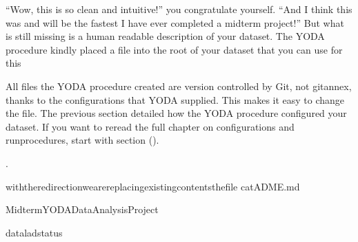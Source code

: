 \sphinxAtStartPar
“Wow, this is so clean and intuitive!” you congratulate yourself. “And I think
this was and will be the fastest I have ever completed a midterm project!”
But what is still missing is a human readable description of your dataset.
The YODA procedure kindly placed a  file into the root of your
dataset that you can use for this%
\begin{footnote}\sphinxAtStartFootnote
All  files the YODA procedure created are
version controlled by Git, not git\sphinxhyphen{}annex, thanks to the
configurations that YODA supplied. This makes it easy to change the
 file. The previous section detailed how the YODA procedure
configured your dataset. If you want to re\sphinxhyphen{}read the full chapter on
configurations and run\sphinxhyphen{}procedures, start with section {\hyperref[\detokenize{basics/101-122-config:config}]{}} ().
%
\end{footnote}.

\begin{sphinxVerbatim}[commandchars=\\\{\}]
withthe\PYGZgt{}redirectionwearereplacingexistingcontentsthefile
catADME.md

MidtermYODADataAnalysisProject



\end{sphinxVerbatim}

\begin{sphinxVerbatim}[commandchars=\\\{\}]
dataladstatus
\end{sphinxVerbatim}

